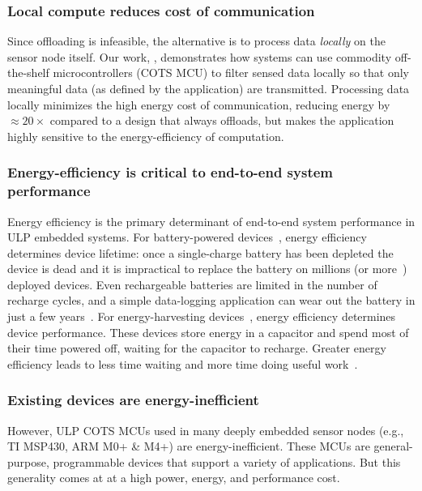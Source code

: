 \subsubsection{Local compute reduces cost of communication}
Since offloading is infeasible,
the alternative is to process data \emph{locally} on the sensor node itself.
% 
Our work, \sonic, demonstrates how systems can use commodity off-the-shelf microcontrollers (COTS MCU) to filter sensed data locally so that only meaningful data (as defined by the application) are transmitted.
% 
Processing data locally minimizes the high energy cost of communication, reducing energy by $\approx20\times$ compared to a design that always offloads, but makes the application highly sensitive to the energy-efficiency of computation.

\subsubsection{Energy-efficiency is critical to end-to-end system performance}
Energy efficiency is the primary determinant of end-to-end system performance in ULP embedded systems.
% 
For battery-powered devices~\cite{culler2002mica,rowe2011sensor}, energy efficiency determines device lifetime: once a single-charge battery has been depleted the device is dead and it is impractical to replace the battery on millions (or more~\cite{arm-trillions}) deployed devices.
% 
Even rechargeable batteries are limited in the number of recharge cycles, and a simple data-logging application can wear out the battery in just a few years~\cite{jackson_2019,nardello2019camaroptera}.
% 
For energy-harvesting devices~\cite{colin2018reconfigurable,hester2015tragedy,flicker,moo,windware}, energy efficiency determines device performance.
% 
These devices store energy in a capacitor and spend most of their time powered off, waiting for the capacitor to recharge.
% 
Greater energy efficiency leads to less time waiting and more time doing useful work~\cite{desai2020power}.

\subsubsection{Existing devices are energy-inefficient}
However, ULP COTS MCUs used in many deeply embedded sensor nodes
(e.g., TI MSP430, ARM M0+ \& M4+) are energy-inefficient.
%
These MCUs are general-purpose, programmable devices that support a variety of
applications.
% 
But this generality comes at at a high power, energy, and performance cost.

